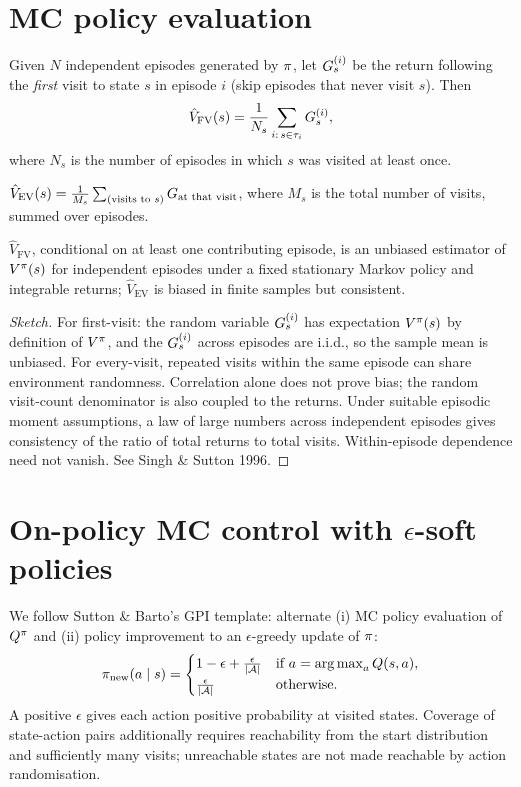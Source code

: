 \documentclass[11pt,oneside]{scrbook}
\begin{document}
\section{MC policy evaluation}

\begin{definition}
Given $N$ independent episodes generated by $\pi$, let $G^{(i)}_s$ be
the return following the \emph{first} visit to state $s$ in episode $i$ (skip
episodes that never visit $s$). Then
\[
\hat V_{\mathrm{FV}}(s) = \frac{1}{N_s} \sum_{i:\,s\in\tau_i} G^{(i)}_s,
\]
where $N_s$ is the number of episodes in which $s$ was visited at least once.
\end{definition}

\begin{definition}
$\hat V_{\mathrm{EV}}(s) = \tfrac{1}{M_s}\sum_{(\text{visits to } s)} G_{\text{at that visit}}$,
where $M_s$ is the total number of visits, summed over episodes.
\end{definition}

\begin{theorem}
$\hat V_{\mathrm{FV}}$, conditional on at least one contributing episode,
is an unbiased estimator of $V^\pi(s)$ for independent episodes under
a fixed stationary Markov policy and integrable returns;
$\hat V_{\mathrm{EV}}$ is biased in finite samples but consistent.
\end{theorem}

\begin{proof}[Sketch]
For first-visit: the random variable $G_s^{(i)}$ has expectation $V^\pi(s)$
by definition of $V^\pi$, and the $G^{(i)}_s$ across episodes are i.i.d.,
so the sample mean is unbiased. For every-visit, repeated visits within the
same episode can share environment randomness. Correlation alone does not
prove bias; the random visit-count denominator is also coupled to the returns.
Under suitable episodic moment assumptions, a law of large numbers across
independent episodes gives consistency of the ratio of total returns to
total visits. Within-episode dependence need not vanish. See Singh \& Sutton 1996. \qedhere
\end{proof}

\section{On-policy MC control with $\epsilon$-soft policies}

We follow Sutton \& Barto's GPI template: alternate
(i) MC policy evaluation of $Q^\pi$ and
(ii) policy improvement to an $\epsilon$-greedy update of $\pi$:
\[
\pi_{\text{new}}(a\mid s) = \begin{cases}
1 - \epsilon + \tfrac{\epsilon}{|\mathcal{A}|} & \text{if } a = \operatorname*{arg\,max}_a Q(s,a),\\
\tfrac{\epsilon}{|\mathcal{A}|} & \text{otherwise.}
\end{cases}
\]
A positive $\epsilon$ gives each action positive probability at visited
states. Coverage of state-action pairs additionally requires reachability
from the start distribution and sufficiently many visits; unreachable
states are not made reachable by action randomisation.
\end{document}
